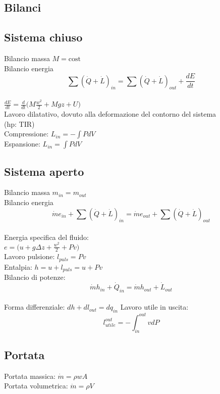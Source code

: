 \documentclass[landscape,a4paper]{article}
\begin{document}
\begin{multicols}{4}


\section*{Bilanci}
\subsection*{Sistema chiuso}
Bilancio massa \(M = \text{cost}\) \\
Bilancio energia \\
\[\sum (\dot{Q}+\dot L)_{in} = \sum (\dot{Q}+ \dot{L})_{out} + \frac{dE}{dt} \] \\
$\frac{dE}{dt} = \frac{d}{dt}\big(M \frac{w^2}{2} + Mgz + U\big)$ \\
Lavoro dilatativo, dovuto alla deformazione del contorno del sistema \\(hp: TIR) \\
Compressione: \( L_{in} = - \int P dV\) \\
Espansione: \(L_{in} = \int P dV\)

\subsection*{Sistema aperto}
Bilancio massa \(m_{in} = m_{out}\) \\
Bilancio energia \\
\[ \dot{m}e_{in} + \sum (\dot{Q}+\dot L)_{in} = \dot{m}e_{out} + \sum (\dot{Q}+ \dot{L})_{out} \] \\
Energia specifica del fluido: \\
\(e = \big(u + g\Delta z + \frac{w^2}{2} + Pv \big)\) \\
Lavoro pulsione: \(l_{puls} = Pv\) \\
Entalpia: \(h = u + l_{puls} = u + Pv\) \\
Bilancio di potenze: \\
\[ \dot{m}h_{in} + \dot{Q}_{in} = \dot{m}h_{out} + \dot{L}_{out} \] \\
Forma differenziale: \(dh + dl_{out} = dq_{in}\)
Lavoro utile in uscita: \\
\[l_{utile}^{out} = - \int_{in}^{out} vdP\]

\subsection*{Portata}
Portata massica: \( \dot m = \rho w A \) \\
Portata volumetrica: \( \dot m = \rho V \)


\end{multicols}
\end{document}
